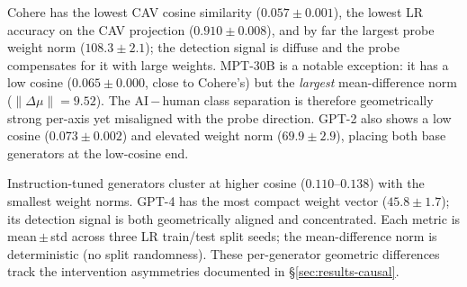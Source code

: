 \documentclass[11pt]{article}
\begin{document}
Cohere has the lowest CAV cosine similarity ($0.057 \pm 0.001$), the lowest LR accuracy on the CAV projection ($0.910 \pm 0.008$), and by far the largest probe weight norm ($108.3 \pm 2.1$); the detection signal is diffuse and the probe compensates for it with large weights. MPT-30B is a notable exception: it has a low cosine ($0.065 \pm 0.000$, close to Cohere's) but the \textit{largest} mean-difference norm ($\|\Delta\mu\| = 9.52$). The AI\,$-$\,human class separation is therefore geometrically strong per-axis yet misaligned with the probe direction. GPT-2 also shows a low cosine ($0.073 \pm 0.002$) and elevated weight norm ($69.9 \pm 2.9$), placing both base generators at the low-cosine end.

Instruction-tuned generators cluster at higher cosine ($0.110$--$0.138$) with the smallest weight norms. GPT-4 has the most compact weight vector ($45.8 \pm 1.7$); its detection signal is both geometrically aligned and concentrated. Each metric is mean\,$\pm$\,std across three LR train/test split seeds; the mean-difference norm is deterministic (no split randomness). These per-generator geometric differences track the intervention asymmetries documented in §\ref{sec:results-causal}.

\begin{table}[!htbp]
\centering
{}
\caption{CAV diagnostics on per-generator stable sets. All values mean\,$\pm$\,std across 3 random seeds. Cosine: similarity between mean-difference CAV and L1 probe weight. LR acc: logistic-regression accuracy on the CAV projection. $\|\Delta\mu\|$: AI\,$-$\,human mean-difference norm (deterministic; bold\,=\,largest). $\|w\|$: L1 weight norm (bold\,=\,smallest).}
\label{tab:cav}
\end{table}
\end{document}
